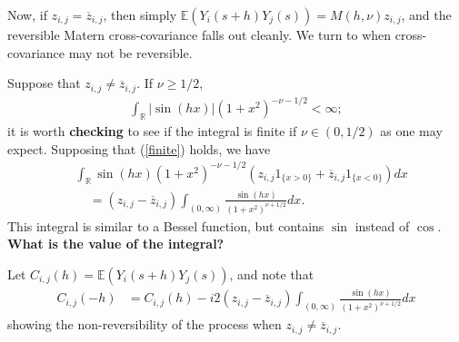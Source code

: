 \documentclass[11pt]{article}
\begin{document}
Now, if $z_{i,j} = \overline{z}_{i,j}$, then simply $\mathbb{E}(Y_i(s+h) Y_j(s))= M(h,\nu)z_{i,j}$, and the reversible Matern cross-covariance falls out cleanly. We turn to when cross-covariance may not be reversible.

Suppose that $z_{i,j}\neq \overline{z}_{i,j}$. If $\nu \geq 1/2$, \begin{align}
\int_\mathbb{R} |\sin(hx) | (1 + x^2)^{-\nu - 1/2} < \infty;\label{finite}
\end{align}it is worth \textbf{checking} to see if the integral is finite if $\nu \in (0, 1/2)$ as one may expect. Supposing that (\ref{finite}) holds, we have 
\begin{align*}
&\int_\mathbb{R}  \sin(hx) (1 + x^2)^{-\nu -1/2}(z_{i,j} 1_{\{x > 0\}} + \overline{z}_{i,j}1_{\{x < 0\}})dx \\
&\ \ \ \ \ = (z_{i,j} - \overline{z}_{i,j}) \int_{(0,\infty)} \frac{\sin(hx)}{(1+x^2)^{\nu +1/2}}dx.  %
\end{align*}This integral is similar to a Bessel function, but contains $\sin$ instead of $\cos$. \textbf{What is the value of the integral?}

Let $C_{i,j}(h) = \mathbb{E}(Y_i(s+h) Y_j(s))$, and note that \begin{align*}
C_{i,j}(-h) %
&= C_{i,j}(h)-i2(z_{i,j} - \overline{z}_{i,j})  \int_{(0,\infty)} \frac{\sin(hx)}{(1+x^2)^{\nu +1/2}}dx
\end{align*}showing the non-reversibility of the process when $z_{i,j} \neq \overline{z}_{i,j}$.
\end{document}
